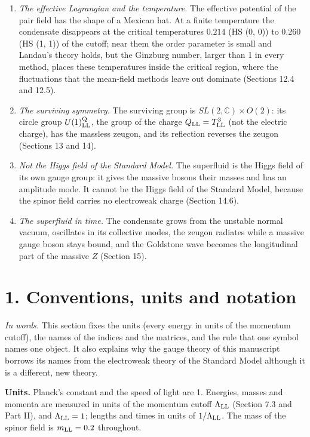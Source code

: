 \documentclass[
  10pt,
]{article}
\begin{document}
\begin{enumerate}
  the model (Sections 11 and 14).
\item
  \emph{The effective Lagrangian and the temperature.} The effective
  potential of the pair field has the shape of a Mexican hat. At a
  finite temperature the condensate disappears at the critical
  temperatures \(0.214\) (HS (0, 0)) to \(0.260\) (HS (1, 1)) of the
  cutoff; near them the order parameter is small and Landau's theory
  holds, but the Ginzburg number, larger than 1 in every method, places
  these temperatures inside the critical region, where the fluctuations
  that the mean-field methods leave out dominate (Sections 12.4 and
  12.5).
\item
  \emph{The surviving symmetry.} The surviving group is
  \(SL(2,\mathbb C)\times O(2)\): its circle group
  \(U(1)^{\rm Q}_{\rm LL}\), the group of the charge
  \(Q_{\rm LL}=T^3_{\rm LL}\) (not the electric charge), has the
  massless zeugon, and its reflection reverses the zeugon (Sections 13
  and 14).
\item
  \emph{Not the Higgs field of the Standard Model.} The superfluid is
  the Higgs field of its own gauge group: it gives the massive bosons
  their masses and has an amplitude mode. It cannot be the Higgs field
  of the Standard Model, because the spinor field carries no electroweak
  charge (Section 14.6).
\item
  \emph{The superfluid in time.} The condensate grows from the unstable
  normal vacuum, oscillates in its collective modes, the zeugon radiates
  while a massive gauge boson stays bound, and the Goldstone wave
  becomes the longitudinal part of the massive \(Z\) (Section 15).
\end{enumerate}

\hypertarget{conventions-units-and-notation}{%
\section{1. Conventions, units and
notation}\label{conventions-units-and-notation}}

\emph{In words.} This section fixes the units (every energy in units of
the momentum cutoff), the names of the indices and the matrices, and the
rule that one symbol names one object. It also explains why the gauge
theory of this manuscript borrows its names from the electroweak theory
of the Standard Model although it is a different, new theory.

\textbf{Units.} Planck's constant and the speed of light are 1.
Energies, masses and momenta are measured in units of the momentum
cutoff \(\Lambda_{\rm LL}\) (Section 7.3 and Part II), and
\(\Lambda_{\rm LL}=1\); lengths and times in units of
\(1/\Lambda_{\rm LL}\). The mass of the spinor field is
\(m_{\rm LL}=0.2\) throughout.
\end{document}
